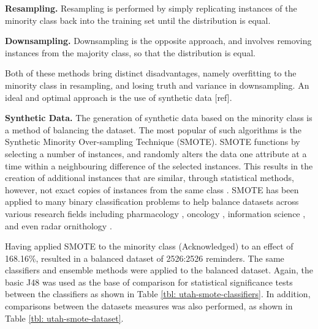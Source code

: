 \textbf{Resampling.}
Resampling is performed by simply replicating instances of the minority class back into the training set until the distribution is equal. 

\textbf{Downsampling.}
Downsampling is the opposite approach, and involves removing instances from the majority class, so that the distribution is equal. 

Both of these methods bring distinct disadvantages, namely overfitting to the minority class in resampling, and losing truth and variance in downsampling. An ideal and optimal approach is the use of synthetic data [ref].

\textbf{Synthetic Data.} The generation of synthetic data based on the minority class is a method of balancing the dataset. The most popular of such algorithms is the Synthetic Minority Over-sampling Technique (SMOTE). SMOTE functions by selecting a number of instances, and randomly alters the data one attribute at a time within a neighbouring difference of the selected instances. This results in the creation of additional instances that are similar, through statistical methods, however, not exact copies of instances from the same class \cite{Chawla2011}. SMOTE has been applied to many binary classification problems to help balance datasets across various research fields including pharmacology \cite{Kumari2015}, oncology \cite{Fehr2015}, information science \cite{Cleland2014-IWAAL, Zhang2013}, and even radar ornithology \cite{D.Rosa2016}.

Having applied SMOTE to the minority class (Acknowledged) to an effect of 168.16\%, resulted in a balanced dataset of 2526:2526 reminders.  
The same classifiers and ensemble methods were applied to the balanced dataset. Again, the basic J48 was used as the base of comparison for statistical significance tests between the classifiers as shown in Table \ref{tbl: utah-smote-classifiers}. In addition, comparisons between the datasets measures was also performed, as shown in Table \ref{tbl: utah-smote-dataset}.


